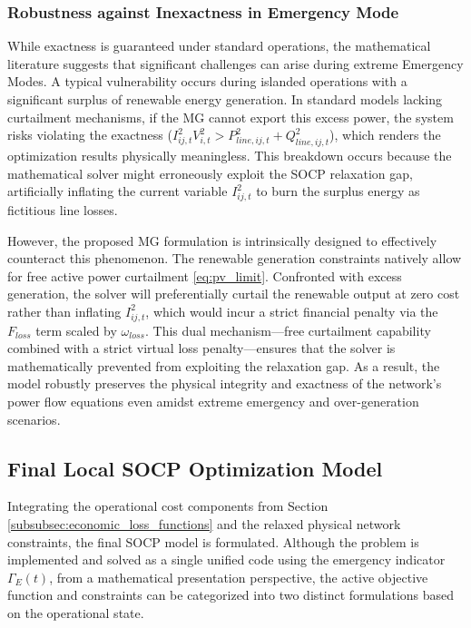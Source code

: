 \subsubsection{Robustness against Inexactness in Emergency Mode}
While exactness is guaranteed under standard operations, the mathematical literature suggests that significant challenges can arise during extreme Emergency Modes. A typical vulnerability occurs during islanded operations with a significant surplus of renewable energy generation. In standard models lacking curtailment mechanisms, if the MG cannot export this excess power, the system risks violating the exactness ($I_{ij,t}^2 V_{i,t}^2 > P_{line,ij,t}^2 + Q_{line,ij,t}^2$), which renders the optimization results physically meaningless. This breakdown occurs because the mathematical solver might erroneously exploit the SOCP relaxation gap, artificially inflating the current variable $I_{ij,t}^2$ to burn the surplus energy as fictitious line losses.

However, the proposed MG formulation is intrinsically designed to effectively counteract this phenomenon. The renewable generation constraints natively allow for free active power curtailment \eqref{eq:pv_limit}. Confronted with excess generation, the solver will preferentially curtail the renewable output at zero cost rather than inflating $I_{ij,t}^2$, which would incur a strict financial penalty via the $F_{loss}$ term scaled by $\omega_{loss}$. This dual mechanism---free curtailment capability combined with a strict virtual loss penalty---ensures that the solver is mathematically prevented from exploiting the relaxation gap. As a result, the model robustly preserves the physical integrity and exactness of the network's power flow equations even amidst extreme emergency and over-generation scenarios.

\subsection{Final Local SOCP Optimization Model}
\label{subsec:final_local_socp}

Integrating the operational cost components from Section \ref{subsubsec:economic_loss_functions} and the relaxed physical network constraints, the final SOCP model is formulated. Although the problem is implemented and solved as a single unified code using the emergency indicator $\Gamma_E(t)$, from a mathematical presentation perspective, the active objective function and constraints can be categorized into two distinct formulations based on the operational state.

